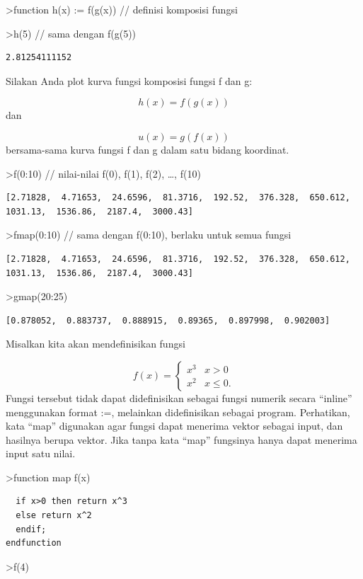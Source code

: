 \documentclass[
]{book}
\begin{document}
\textgreater function h(x) := f(g(x)) // definisi komposisi fungsi

\textgreater h(5) // sama dengan f(g(5))

\begin{verbatim}
2.81254111152
\end{verbatim}

Silakan Anda plot kurva fungsi komposisi fungsi f dan g:

\[h(x)=f(g(x))\]dan

\[u(x)=g(f(x))\]bersama-sama kurva fungsi f dan g dalam satu bidang koordinat.

\textgreater f(0:10) // nilai-nilai f(0), f(1), f(2), \ldots, f(10)

\begin{verbatim}
[2.71828,  4.71653,  24.6596,  81.3716,  192.52,  376.328,  650.612,
1031.13,  1536.86,  2187.4,  3000.43]
\end{verbatim}

\textgreater fmap(0:10) // sama dengan f(0:10), berlaku untuk semua fungsi

\begin{verbatim}
[2.71828,  4.71653,  24.6596,  81.3716,  192.52,  376.328,  650.612,
1031.13,  1536.86,  2187.4,  3000.43]
\end{verbatim}

\textgreater gmap(20:25)

\begin{verbatim}
[0.878052,  0.883737,  0.888915,  0.89365,  0.897998,  0.902003]
\end{verbatim}

Misalkan kita akan mendefinisikan fungsi

\[f(x) = \begin{cases} x^3 & x>0 \\ x^2 & x\le 0. \end{cases}\]Fungsi tersebut tidak dapat didefinisikan sebagai fungsi numerik secara ``inline'' menggunakan format :=, melainkan didefinisikan sebagai program. Perhatikan, kata ``map'' digunakan agar fungsi dapat menerima vektor sebagai input, dan hasilnya berupa vektor. Jika tanpa kata ``map'' fungsinya hanya dapat menerima input satu nilai.

\textgreater function map f(x)

\begin{verbatim}
  if x>0 then return x^3
  else return x^2
  endif;
endfunction
\end{verbatim}

\textgreater f(4)
\end{document}
